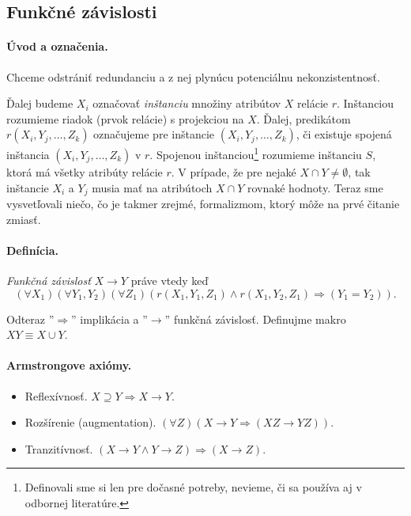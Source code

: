 \documentclass[10pt,a4paper]{article}
\begin{document}
\subsection{Funkčné závislosti}

\paragraph{Úvod a označenia.}
Chceme odstrániť redundanciu a z nej plynúcu potenciálnu nekonzistentnosť. 

Ďalej budeme $X_i$ označovať \emph{inštanciu} množiny atribútov $X$ relácie $r$. 
Inštanciou rozumieme riadok (prvok relácie) s projekciou na $X$.
Ďalej, predikátom $r(X_i,Y_j, \ldots, Z_k)$ označujeme pre inštancie $(X_i,Y_j, \ldots, Z_k)$, či existuje spojená inštancia $(X_i,Y_j, \ldots, Z_k)$ v $r$.
Spojenou inštanciou\footnote{Definovali sme si len pre dočasné potreby, nevieme, či sa používa aj v odbornej literatúre.} 
rozumieme inštanciu $S$, ktorá má všetky atribúty relácie $r$. V prípade, že pre nejaké $X \cap Y \neq \emptyset$, tak inštancie $X_i$ a $Y_j$ musia mať na atribútoch $X \cap Y$ rovnaké hodnoty.  
Teraz sme vysvetľovali niečo, čo je takmer zrejmé, formalizmom, ktorý môže na prvé čitanie zmiasť. 

\paragraph{Definícia.}
\emph{Funkčná závislosť} $X \rightarrow Y$ práve vtedy keď 
$$(\forall X_1)(\forall Y_1,Y_2)(\forall Z_1) (r(X_1, Y_1, Z_1) \wedge r(X_1, Y_2, Z_1) \Rightarrow (Y_1 = Y_2)).$$

Odteraz ''$\Rightarrow$'' implikácia a ''$\rightarrow$'' funkčná závislosť.
Definujme makro $XY \equiv X \cup Y$. 

\paragraph{Armstrongove axiómy.} 
\begin{itemize}
\item Reflexívnosť. $X \supseteq Y \Rightarrow X \rightarrow Y$.
\item Rozšírenie (augmentation). $(\forall Z)(X \rightarrow Y \Rightarrow (XZ \rightarrow YZ))$.
\item Tranzitívnosť. $(X \rightarrow Y \wedge Y \rightarrow Z) \Rightarrow (X \rightarrow Z)$.
\end{itemize}
 
\end{document}

